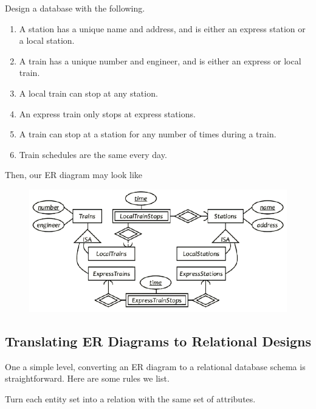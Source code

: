 \documentclass{article}
\begin{document}
    \begin{example}
      Design a database with the following. 
      \begin{enumerate}
        \item A station has a unique name and address, and is either an express station or a local station. 
        \item A train has a unique number and engineer, and is either an express or local train. 
        \item A local train can stop at any station. 
        \item An express train only stops at express stations. 
        \item A train can stop at a station for any number of times during a train. 
        \item Train schedules are the same every day. 
      \end{enumerate}
      Then, our ER diagram may look like 
      \begin{figure}[H]
        \centering 
        \includegraphics[scale=0.4]{img/train1.png}
        \caption{} 
        \label{fig:train1}
      \end{figure}
    \end{example}

  \subsection{Translating ER Diagrams to Relational Designs}

    One a simple level, converting an ER diagram to a relational database schema is straightforward. Here are some rules we list. 

    \begin{theorem}
      Turn each entity set into a relation with the same set of attributes. 
    \end{theorem}
\end{document}
